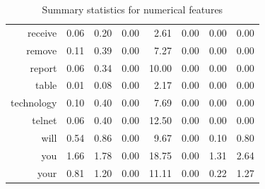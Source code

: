 \documentclass{article}\usepackage[]{graphicx}\usepackage[]{xcolor}
\begin{document}
\begin{table}[ht]
\begin{tabular}{rrrrrrrr}
  receive & 0.06 & 0.20 & 0.00 & 2.61 & 0.00 & 0.00 & 0.00 \\ 
  remove & 0.11 & 0.39 & 0.00 & 7.27 & 0.00 & 0.00 & 0.00 \\ 
  report & 0.06 & 0.34 & 0.00 & 10.00 & 0.00 & 0.00 & 0.00 \\ 
  table & 0.01 & 0.08 & 0.00 & 2.17 & 0.00 & 0.00 & 0.00 \\ 
  technology & 0.10 & 0.40 & 0.00 & 7.69 & 0.00 & 0.00 & 0.00 \\ 
  telnet & 0.06 & 0.40 & 0.00 & 12.50 & 0.00 & 0.00 & 0.00 \\ 
  will & 0.54 & 0.86 & 0.00 & 9.67 & 0.00 & 0.10 & 0.80 \\ 
  you & 1.66 & 1.78 & 0.00 & 18.75 & 0.00 & 1.31 & 2.64 \\ 
  your & 0.81 & 1.20 & 0.00 & 11.11 & 0.00 & 0.22 & 1.27 \\ 
   \hline
\end{tabular}
\caption{Summary statistics for numerical features} 
\label{tab1}
\end{table}
\end{document}
